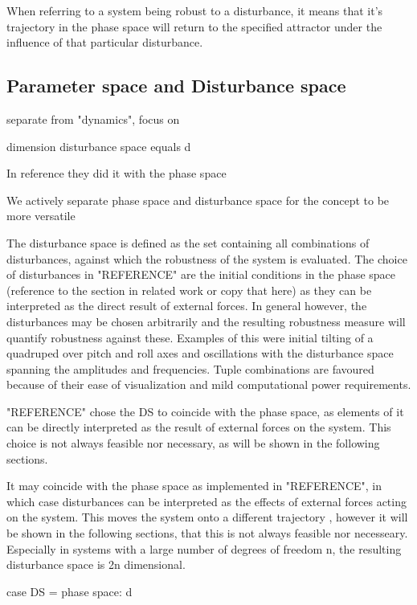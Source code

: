    When referring to a system being robust to a disturbance, it means that it's trajectory in the phase space will return to the specified attractor under the influence of that particular disturbance. 



\subsection{ Parameter space and Disturbance space}
    
    separate from "dynamics", focus on 

    dimension disturbance space equals d

    In reference they did it with the phase space  

    We actively separate phase space and disturbance space for the concept to be more versatile

    The disturbance space is defined as the set containing all combinations of disturbances, against which the robustness of the system is evaluated. The choice of disturbances in "REFERENCE" are the initial conditions in the phase space (reference to the section in related work or copy that here) as they can be interpreted as the direct result of external forces. In general however, the disturbances may be chosen arbitrarily and the resulting robustness measure will quantify robustness against these. Examples of this were initial tilting of a quadruped over pitch and roll axes and oscillations with the disturbance space spanning the amplitudes and frequencies. Tuple combinations are favoured because of their ease of visualization and mild computational power requirements.  

    "REFERENCE" chose the DS to coincide with the phase space, as elements of it can be directly interpreted as the result of external forces on the system. This choice is not always feasible nor necessary, as will be shown in the following sections. 

    It may coincide with the phase space as implemented in "REFERENCE", in which case disturbances can be interpreted as the effects of external forces acting on the system. This moves the system onto a different trajectory 
    , however it will be shown in the following sections, that this is not always feasible nor necesseary. Especially in systems with a large number of degrees of freedom n, the resulting disturbance space is 2n dimensional. 

    case DS = phase space: d

